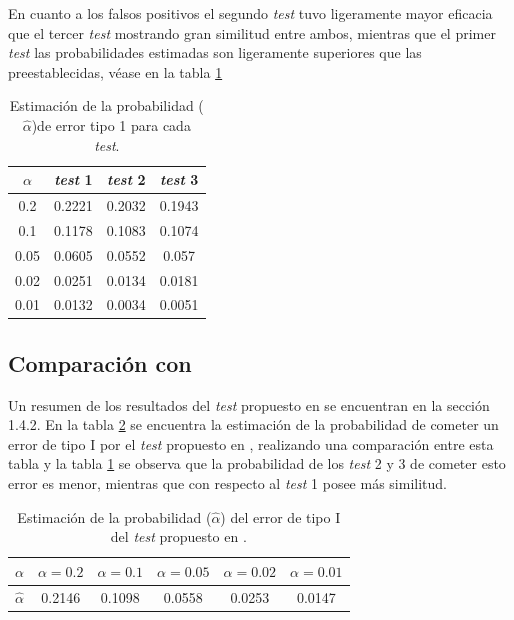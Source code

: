 \documentclass[12pt]{report}
\begin{document}
En cuanto a los falsos positivos  el segundo \textit{test} tuvo ligeramente mayor eficacia que el tercer \textit{test} mostrando gran similitud entre ambos, mientras que el primer \textit{test} las probabilidades estimadas son ligeramente superiores que las preestablecidas, véase en la tabla \ref{tab:error1}
\begin{table}[h!]
	\centering
	\begin{tabular}{|c|ccc|}
		\hline
		$\alpha$& \textit{test} 1 & \textit{test} 2 & \textit{test} 3  \\
		\hline
		0.2 &  0.2221    & 0.2032    &  0.1943   \\
		0.1 &  0.1178    & 0.1083    &  0.1074   \\
		0.05&  0.0605    & 0.0552    &  0.057   \\
		0.02&  0.0251    & 0.0134    &  0.0181   \\
		0.01&  0.0132    & 0.0034    &  0.0051   \\
		\hline
	\end{tabular}
	\caption{Estimación de la probabilidad ($\hat{\alpha}$)de error tipo 1 para cada \textit{test}.}
	\label{tab:error1}
\end{table}
	\subsection{Comparación con \cite{13}}
	Un resumen de los resultados del \textit{test} propuesto en \cite{13} se encuentran en la sección 1.4.2. En la tabla \ref{tab:erro1-sensor} se encuentra la estimación de la probabilidad de cometer un error de tipo I por el \textit{test} propuesto en \cite{13}, realizando una comparación entre esta tabla y la tabla \ref{tab:error1} se observa que la probabilidad de los \textit{test} 2 y 3 de cometer esto error es menor, mientras que con respecto al \textit{test} 1 posee más similitud. 
	\begin{table}[h!]
		\centering
		\begin{tabular}{|c|ccccc|}
			\hline
			$\alpha$ & $\alpha = 0.2$ & $\alpha = 0.1$ & $\alpha = 0.05$ & $\alpha = 0.02$ & $\alpha = 0.01$ \\
			\hline
			$\hat{\alpha}$ & 0.2146 & 0.1098 & 0.0558 & 0.0253 & 0.0147 \\
			\hline
		\end{tabular}
		\caption{Estimación de la probabilidad ($\hat{\alpha}$) del error de tipo I del \textit{test} propuesto en \cite{13}.}
		\label{tab:erro1-sensor}
	\end{table}
	
\end{document}
